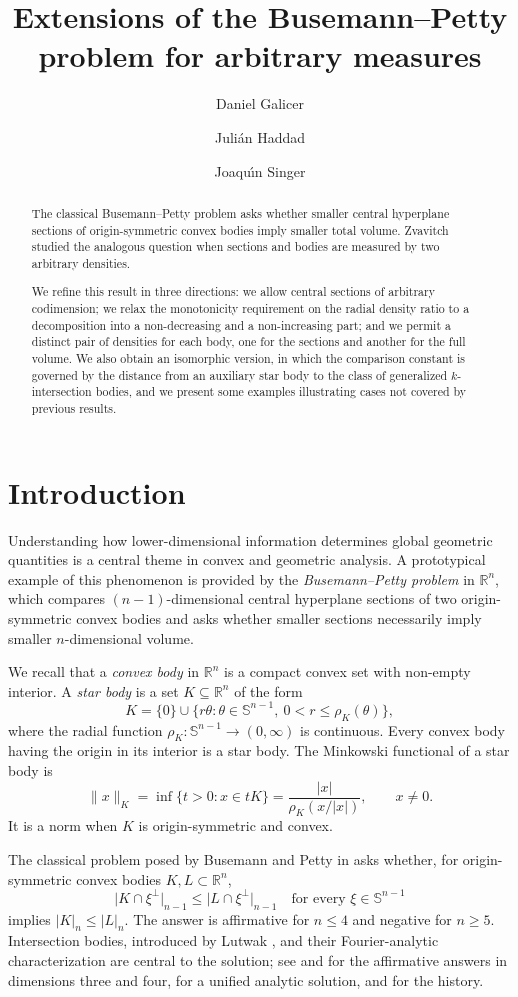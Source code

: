 \documentclass{amsart}
\title[Extensions of the Busemann--Petty problem]
{Extensions of the Busemann--Petty problem for arbitrary measures}
\author[D. Galicer]{Daniel Galicer} \address{Universidad Torcuato Di Tella. Departamento de Matem\'aticas y Estad\'istica. IMAS--CONICET. Av. Figueroa Alcorta 7350, C1428 Buenos Aires, Argentina} \email{daniel.galicer@utdt.edu}
\author[J. Haddad]{Juli\'{a}n Haddad}
\author[J. Singer]{Joaqu\'{\i}n Singer}
\theoremstyle{remark}
\newcommand{\R}{\mathbb{R}}
\newcommand{\Sph}{\mathbb{S}}
\newcommand{\vol}[2][n]{\lvert #2\rvert_{#1}}
\begin{document}
\begin{abstract}
The classical Busemann--Petty problem asks whether smaller central
hyperplane sections of origin-symmetric convex bodies imply smaller total
volume. Zvavitch studied the analogous question when sections and bodies are
measured by two arbitrary densities.

We refine this result in three directions: we allow central sections of
arbitrary codimension; we relax the monotonicity requirement on the radial
density ratio to a decomposition into a non-decreasing and a non-increasing
part; and we permit a distinct pair of densities for each body, one for the
sections and another for the full volume. We also obtain an isomorphic
version, in which the comparison constant is governed by the distance from an
auxiliary star body to the class of generalized $k$-intersection bodies, and
we present some examples illustrating cases not covered by previous results.
\end{abstract}

\maketitle

\section{Introduction}

Understanding how lower-dimensional information determines global geometric
quantities is a central theme in convex and geometric analysis. A prototypical
example of this phenomenon is provided by the \emph{Busemann--Petty problem}
in $\R^n$, which compares $(n-1)$-dimensional central hyperplane sections of
two origin-symmetric convex bodies and asks whether smaller sections
necessarily imply smaller $n$-dimensional volume.

We recall that a \emph{convex body} in $\R^n$ is a
compact convex set with non-empty interior. A \emph{star body} is a set
$K\subseteq\R^n$ of the form
\[
 K=\{0\}\cup\{r\theta: \theta\in\Sph^{n-1},\ 0<r\leq \rho_K(\theta)\},
\]
where the radial function $\rho_K:\Sph^{n-1}\to(0,\infty)$ is continuous.
Every convex body having the origin in its interior is a star body.
The Minkowski functional of a star body is
\[
 \lVert x\rVert_K
 =\inf\{t>0:x\in tK\}
 =\frac{|x|}{\rho_K(x/|x|)},\qquad x\neq0.
\]
It is a norm when $K$ is origin-symmetric and convex.

The classical problem posed by Busemann and Petty in \cite{BusemannPetty1956}
asks whether, for origin-symmetric convex bodies $K,L\subset\R^n$,
\[
 \vol[n-1]{K\cap\xi^\perp}
 \leq \vol[n-1]{L\cap\xi^\perp}
 \quad\text{for every }\xi\in\Sph^{n-1}
\]
implies $\vol{K}\leq\vol{L}$. The answer is affirmative for $n\leq4$ and
negative for $n\geq5$. Intersection bodies, introduced by Lutwak
\cite{Lutwak1988}, and their Fourier-analytic characterization
\cite{Koldobsky1998} are central to the solution; see \cite{Gardner1994} and
\cite{Zhang1999} for the affirmative answers in dimensions three and four,
\cite{GKS1999} for a unified analytic solution, and
\cite{GardnerBook,KoldobskyBook} for the history.
\end{document}
